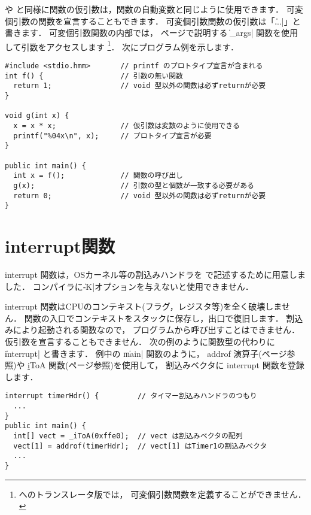 \cl や \javal と同様に関数の仮引数は，関数の自動変数と同じように使用できます．
可変個引数の関数を宣言することもできます．
可変個引数関数の仮引数は「\|...|」と書きます．
可変個引数関数の内部では，
\pageref{chap4:args}ページで説明する
\|_args| 関数を使用して引数をアクセスします
\footnote{\cl へのトランスレータ版では，
可変個引数関数を定義することができません．}．
次にプログラム例を示します．

\begin{mylist}
\begin{verbatim}
#include <stdio.hmm>       // printf のプロトタイプ宣言が含まれる
int f() {                  // 引数の無い関数
  return 1;                // void 型以外の関数は必ずreturnが必要
}

void g(int x) {
  x = x * x;               // 仮引数は変数のように使用できる
  printf("%04x\n", x);     // プロトタイプ宣言が必要
}

public int main() {
  int x = f();             // 関数の呼び出し
  g(x);                    // 引数の型と個数が一致する必要がある
  return 0;                // void 型以外の関数は必ずreturnが必要
}
\end{verbatim}
\end{mylist}

\section{interrupt関数}
interrupt 関数は，OSカーネル等の割込みハンドラを\cmml
で記述するために用意しました．
コンパイラに\|-K|オプションを与えないと使用できません．

interrupt 関数はCPUのコンテキスト(フラグ，レジスタ等)を全く破壊しません．
関数の入口でコンテキストをスタックに保存し，出口で復旧します．
割込みにより起動される関数なので，
プログラムから呼び出すことはできません．
仮引数を宣言することもできません．
次の例のように関数型の代わりに \|interrupt| と書きます．
例中の \|main| 関数のように，
addrof 演算子(\pageref{chap3:addrof}ページ参照)や
\ul iToA 関数(\pageref{chap4:itoa}ページ参照)を使用して，
割込みベクタに interrupt 関数を登録します．

\begin{mylist}
\begin{verbatim}
interrupt timerHdr() {         // タイマー割込みハンドラのつもり
  ...
}
public int main() {
  int[] vect = _iToA(0xffe0);  // vect は割込みベクタの配列
  vect[1] = addrof(timerHdr);  // vect[1] はTimer1の割込みベクタ
  ...
}
\end{verbatim}
\end{mylist}

